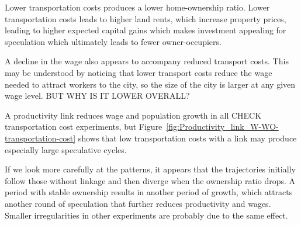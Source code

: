 

Lower transportation costs produces a lower home-ownership ratio. Lower transportation costs leads to higher land rents, which increase  property prices, leading to higher expected capital gains which makes investment appealing for speculation which ultimately leads to fewer owner-occupiers.

A decline in the wage also appears to accompany reduced transport costs. This may be understood by noticing that lower transport costs reduce the wage needed to attract workers to the city, so the size of the city is larger at any given wage level. {\color{red} BUT WHY IS IT LOWER OVERALL?} 


A productivity link reduces wage and population growth in all {\color{red}CHECK  transportation cost} experiments,  but Figure~\ref{fig:Productivity_link_W-WO-transportation-cost} %
shows that low transportation costs with a link may produce especially large speculative cycles. %

If we look more carefully at the patterns, it appears that the trajectories initially follow those without linkage and then diverge when the ownership ratio drops. A period with stable ownership results in another period of growth, which attracts another round of speculation that further reduces productivity and wages. Smaller irregularities in other experiments are probably due to the same effect.

